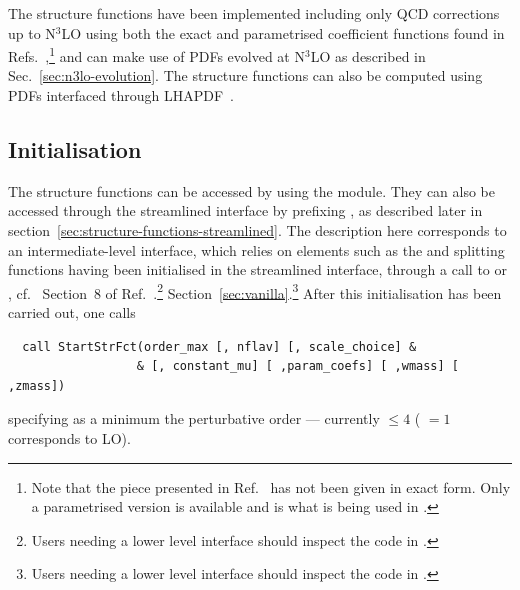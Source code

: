 The structure functions have been implemented including only QCD
corrections up to N$^3$LO using both the exact and parametrised
coefficient functions found in
Refs.~\cite{vanNeerven:1999ca,vanNeerven:2000uj,Moch:2004xu,Vermaseren:2005qc,Moch:2008fj,Davies:2016ruz,Blumlein:2022gpp},\footnote{Note
that the piece presented in Ref.~\cite{Davies:2016ruz} has not been
given in exact form. Only a parametrised version is available and
is what is being used in \hoppet.}  and can make use of PDFs evolved
at N$^3$LO as described in Sec.~\ref{sec:n3lo-evolution}. The
structure functions can also be computed using PDFs interfaced through
LHAPDF~\cite{LHAPDF}.

\subsection{Initialisation}
\label{sec:structure-funcs-init}

The structure functions can be accessed by using the
 module.
%
They can also be accessed through the
streamlined interface by prefixing , as described
later in section~\ref{sec:structure-functions-streamlined}.
%
The description here corresponds to an intermediate-level interface, which
relies on elements such as the  and splitting functions
having been initialised in the streamlined interface, through a call
to  or , cf.\
%
\ifreleasenote
Section~8 of Ref.~\cite{Salam:2008qg}.\footnote{Users needing a lower level
  interface should inspect the code in .}
\else
Section~\ref{sec:vanilla}.\footnote{Users needing a lower level
  interface should inspect the code in .}
\fi
%
After this initialisation has been carried out, one calls
\begin{lstlisting}
  call StartStrFct(order_max [, nflav] [, scale_choice] &
                  & [, constant_mu] [ ,param_coefs] [ ,wmass] [ ,zmass])
\end{lstlisting}
specifying as a minimum the perturbative order --- currently
 $ \le 4$ (\ttt{order\_max} $ =1$ corresponds to LO).

